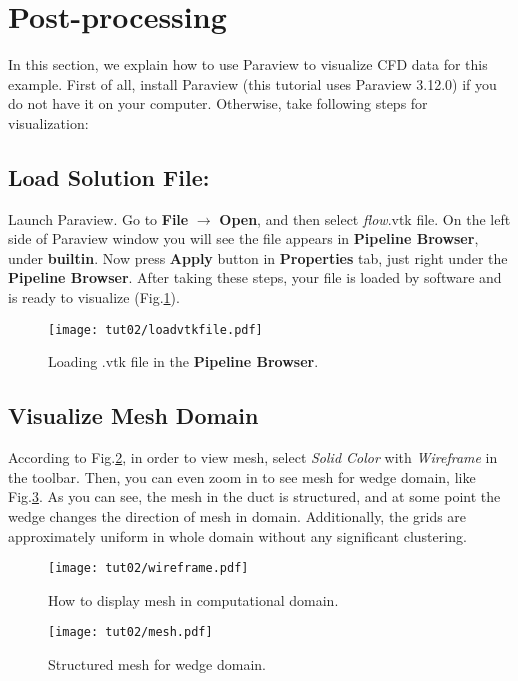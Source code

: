 \section{Post-processing}
In this section, we explain how to use Paraview to visualize CFD data for this example. First of all, install Paraview (this tutorial uses Paraview 3.12.0) if you do not have it on your computer. Otherwise, take following steps for visualization:
\subsection{Load Solution File:}
Launch Paraview. Go to \textbf{File} $\rightarrow$ \textbf{Open}, and then select \textit{flow}.vtk file. On the left side of Paraview window you will see the file appears in \textbf{Pipeline Browser}, under \textbf{builtin}. Now press \textbf{Apply} button in \textbf{Properties} tab, just right under the  \textbf{Pipeline Browser}. After taking these steps, your file is loaded by software and is ready to visualize (Fig.\ref{fig2:load}).
\begin{figure}[htbp]
    \centering
    \texttt{[image: tut02/loadvtkfile.pdf]}
    \caption{Loading .vtk file in the \textbf{Pipeline Browser}.}
    \label{fig2:load}
\end{figure}
\subsection{Visualize Mesh Domain}
According to Fig.\ref{fig2:wireframe}, in order to view mesh, select \textit{Solid Color} with \textit{Wireframe} in the toolbar. Then, you can even zoom in to see mesh for wedge domain, like Fig.\ref{fig2:mesh}. As you can see, the mesh in the duct is structured, and at some point the wedge changes the direction of mesh in domain. Additionally, the grids are approximately uniform in whole domain without any significant clustering.
\begin{figure}[htbp]
    \centering
    \texttt{[image: tut02/wireframe.pdf]}
    \caption{How to display mesh in computational domain.}
    \label{fig2:wireframe}
\end{figure}
\begin{figure}[htbp]
    \centering
    \texttt{[image: tut02/mesh.pdf]}
    \caption{Structured mesh for wedge domain.}
    \label{fig2:mesh}
\end{figure}
